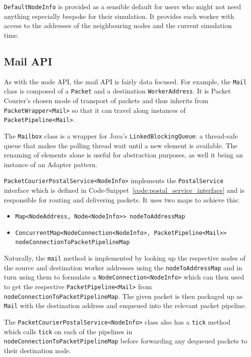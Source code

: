 \texttt{DefaultNodeInfo} is provided as a sensible default for users who might not need anything especially bespoke
for their simulation. It provides each worker with access to the addresses of the neighbouring nodes and the current
simulation time.

\subsection{Mail API}\label{subsection:mail_api}

As with the node API, the mail API is fairly data focused. For example, the \texttt{Mail} class is composed of a
\texttt{Packet} and a destination \texttt{WorkerAddress}. It is Packet Courier's chosen mode of transport of packets
and thus inherits from \texttt{PacketWrapper<Mail>} so that it can travel along instances of
\texttt{PacketPipeline<Mail>}.

The \texttt{Mailbox} class is a wrapper for Java's \texttt{LinkedBlockingQueue}\cite{java_LinkedBlockingQueue}: a
thread-safe queue that makes the polling thread wait until a new element is available. The renaming of elements alone
is useful for abstraction purposes, as well it being an instance of an Adapter pattern\cite{adapter_pattern}.

\texttt{PacketCourierPostalService<NodeInfo>} implements the \texttt{PostalService} interface which is defined in
Code-Snippet~\ref{code:postal_service_interface} and is responsible for routing and delivering packets. It uses two
maps to achieve this:
\begin{itemize}
    \item \texttt{Map<NodeAddress, Node<NodeInfo>> nodeToAddressMap}
    \item \texttt{ConcurrentMap<NodeConnection<NodeInfo>, PacketPipeline<Mail>>}
    \texttt{nodeConnectionToPacketPipelineMap}
\end{itemize}

Naturally, the \texttt{mail} method is implemented by looking up the respective nodes of the source and destination
worker addresses using the \texttt{nodeToAddressMap} and in turn using them to formulate a
\texttt{NodeConnection<NodeInfo>} which can then used to get the respective \texttt{PacketPipeline<Mail>} from
\texttt{nodeConnectionToPacketPipelineMap}. The given packet is then packaged up as \texttt{Mail} with the
destination address and enqueued into the relevant packet pipeline.

The \texttt{PacketCourierPostalService<NodeInfo>} class also has a \texttt{tick} method which calls \texttt{tick} on
each of the pipelines in \texttt{nodeConnectionToPacketPipelineMap} before forwarding any dequeued packets to their
destination node.


